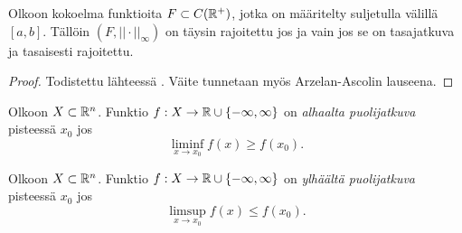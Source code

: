 \documentclass[12pt,oneside,a4paper]{amsbook} %
\begin{document}
\begin{theorem}\label{thm:ascoli-arzela}
    Olkoon kokoelma funktioita $F \subset C({\mathbb{R}^{+}})$, jotka on määritelty suljetulla välillä $[a, b]$. Tällöin $(F, ||\cdot||_\infty)$ on täysin rajoitettu jos ja vain jos se on tasajatkuva ja tasaisesti rajoitettu.
\end{theorem}
\begin{proof}
    Todistettu lähteessä \cite[s. 158]{rudin}. Väite tunnetaan myös Arzelan-Ascolin lauseena.
\end{proof}

\begin{definition}
    Olkoon $X\subset \mathbb{R}^n$. Funktio $f: X \to \mathbb{R} \cup\{-\infty, \infty\}$ on \textit{alhaalta puolijatkuva} pisteessä $x_0$ jos 
    $$\liminf_{x\to x_0}  f(x) \ge f(x_0).$$
\end{definition}

\begin{definition}
    Olkoon $X\subset \mathbb{R}^n$. Funktio $f: X \to \mathbb{R} \cup\{-\infty, \infty\}$ on \textit{ylhäältä puolijatkuva} pisteessä $x_0$ jos 
    $$\limsup_{x\to x_0}  f(x) \le f(x_0).$$
\end{definition}
\end{document}
